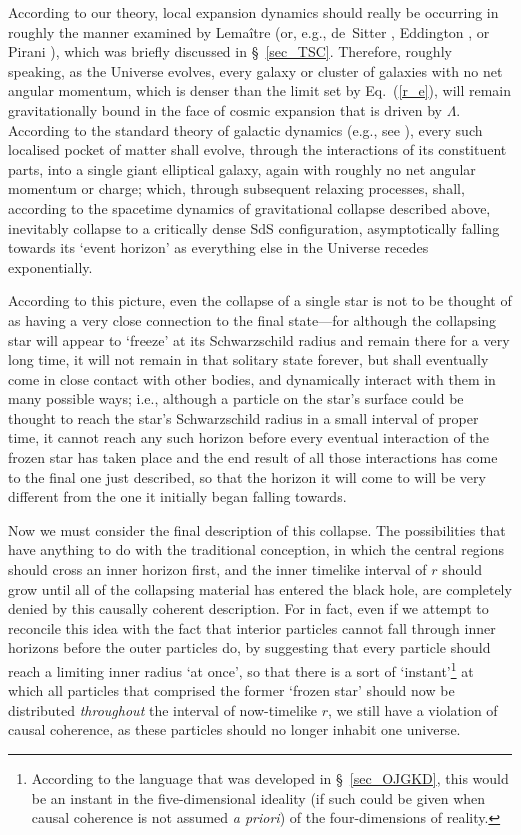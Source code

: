 {According to our theory, local expansion dynamics should really be occurring in roughly the manner examined by Lema\^{i}tre \cite{Lemaitre1933,Lemaitre1997,Lemaitre1934,Lemaitre1949,Lemaitre1952,Lemaitre1958} (or, e.g., de~Sitter \cite{deSitter1933a}, Eddington \cite{Eddington1933}, or Pirani \cite{Pirani1954}), which was briefly discussed in \S~\ref{sec_TSC}. Therefore, roughly speaking, as the Universe evolves, every galaxy or cluster of galaxies with no net angular momentum, which is denser than the limit set by Eq.~(\ref{r_e}), will remain gravitationally bound in the face of cosmic expansion that is driven by $\Lambda$. According to the standard theory of galactic dynamics (e.g., see \cite{Schweizer1986,Krauss2000}), every such localised pocket of matter shall evolve, through the interactions of its constituent parts, into a single giant elliptical galaxy, again with roughly no net angular momentum or charge; which, through subsequent relaxing processes, shall, according to the spacetime dynamics of gravitational collapse described above, inevitably collapse to a critically dense SdS configuration, asymptotically falling towards its `event horizon' as everything else in the Universe recedes exponentially.

According to this picture, even the collapse of a single star is not to be thought of as having a very close connection to the final state---for although the collapsing star will appear to `freeze' at its Schwarzschild radius and remain there for a very long time, it will not remain in that solitary state forever, but shall eventually come in close contact with other bodies, and dynamically interact with them in many possible ways; i.e., although a particle on the star's surface could be thought to reach the star's Schwarzschild radius in a small interval of proper time, it cannot reach any such horizon before every eventual interaction of the frozen star has taken place and the end result of all those interactions has come to the final one just described, so that the horizon it will come to will be very different from the one it initially began falling towards.

Now we must consider the final description of this collapse. The possibilities that have anything to do with the traditional conception, in which the central regions should cross an inner horizon first, and the inner timelike interval of $r$ should grow until all of the collapsing material has entered the black hole, are completely denied by this causally coherent description. For in fact, even if we attempt to reconcile this idea with the fact that interior particles cannot fall through inner horizons before the outer particles do, by suggesting that every particle should reach a limiting inner radius `at once', so that there is a sort of `instant'\footnote{According to the language that was developed in \S~\ref{sec_OJGKD}, this would be an instant in the five-dimensional ideality (if such could be given when causal coherence is not assumed \textit{a priori}) of the four-dimensions of reality.} at which all particles that comprised the former `frozen star' should now be distributed \textit{throughout} the interval of now-timelike $r$, we still have a violation of causal coherence, as these particles should no longer inhabit one universe.

}
